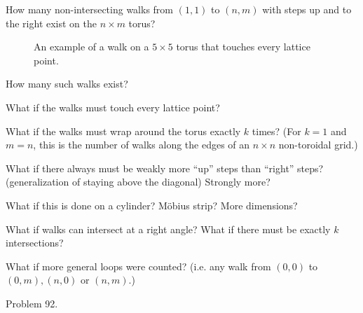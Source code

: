 \documentclass{article}
\begin{document}
  How many non-intersecting walks from $(1,1)$ to $(n, m)$ with steps up and to
  the right exist on the $n \times m$ torus?
\begin{figure}[ht!]
  \centering
  \caption{An example of a walk on a $5 \times 5$ torus that touches every lattice point.}
\end{figure}

\begin{question}
  How many such walks exist?
\end{question}

\begin{related}
  \item What if the walks must touch every lattice point?
  \item What if the walks must wrap around the torus exactly $k$ times?
  (For $k = 1$ and $m = n$, this is the number of walks along the edges of an
  $n \times n$ non-toroidal grid.)
  \item What if there always must be weakly more ``up'' steps than ``right''
    steps? (generalization of staying above the diagonal) Strongly more?
  \item What if this is done on a cylinder? M\"obius strip? More dimensions?
  \item What if walks can intersect at a right angle? What if there must be exactly $k$ intersections?
  \item What if more general loops were counted? (i.e. any walk from $(0,0)$ to $(0,m), (n,0)$ or $(n,m)$.)
\end{related}

\begin{references}
  \item Problem 92.
\end{references}
\end{document}
